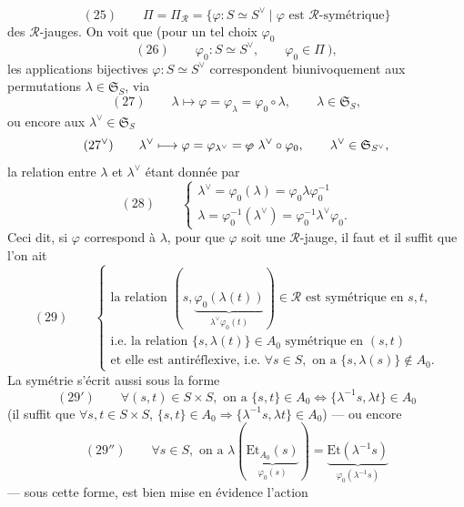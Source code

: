 \documentclass[11pt,a4paper]{article}
\begin{document}
\[
(25)\qquad \Pi = \Pi_{\mathcal{R}} = \{\varphi : S \simeq S^{\vee} \mid \varphi \text{ est } \mathcal{R}\text{-symétrique}\}
\]
des $\mathcal{R}$-jauges.  On voit que (pour un tel
choix $\varphi_0$
\[
(26)\qquad \varphi_0 : S \simeq S^{\vee}, \qquad \varphi_0 \in \Pi\ ),
\]
les applications bijectives $\varphi : S \simeq S^{\vee}$ correspondent
biunivoquement aux permutations $\lambda \in \mathfrak{S}_S$, via
\[
(27)\qquad \lambda \longmapsto \varphi = \varphi_{\lambda} = \varphi_0 \circ \lambda, \qquad \lambda \in \mathfrak{S}_S,
\]
ou encore aux $\lambda^{\vee} \in \mathfrak{S}_{S}$
\[
(27^{\vee})\qquad \lambda^{\vee} \longmapsto \varphi = \varphi_{\lambda^{\vee}} = \text{\struck{$\varphi$}}\ \lambda^{\vee} \circ \varphi_0, \qquad \lambda^{\vee} \in \mathfrak{S}_{S^{\vee}},
\]
la relation entre $\lambda$ et $\lambda^{\vee}$ étant donnée par
\[
(28)\qquad
\begin{cases}
\lambda^{\vee} = \varphi_0(\lambda) = \varphi_0 \lambda \varphi_0^{-1} \\
\lambda = \varphi_0^{-1}(\lambda^{\vee}) = \varphi_0^{-1} \lambda^{\vee} \varphi_0 .
\end{cases}
\]
Ceci dit, si $\varphi$ correspond à $\lambda$, pour que $\varphi$ soit une
$\mathcal{R}$-jauge, il faut et il suffit que l'on ait
\[
(29)\qquad
\begin{cases}
\text{la relation } (s, \underbrace{\varphi_0(\lambda(t))}_{\lambda^{\vee}\varphi_0(t)}) \in \mathcal{R} \text{ est symétrique en } s,t, \\
\text{i.e. la relation } \{s, \lambda(t)\} \in A_0 \text{ symétrique en } (s,t) \\
\text{et elle est antiréflexive, i.e. } \forall s \in S, \text{ on a } \{s, \lambda(s)\} \notin A_0 .
\end{cases}
\]
La symétrie s'écrit aussi sous la forme
\[
(29')\qquad \forall (s,t) \in S \times S, \text{ on a } \{s,t\} \in A_0 \Longleftrightarrow \{\lambda^{-1}s, \lambda t\} \in A_0
\]
(il suffit que $\forall s,t \in S \times S$,
$\{s,t\} \in A_0 \Longrightarrow \{\lambda^{-1}s, \lambda t\} \in A_0$)
— ou encore
\[
(29'')\qquad \forall s \in S, \text{ on a } \lambda(\underbrace{\mathrm{Et}_{A_0}(s)}_{\varphi_0(s)}) = \underbrace{\mathrm{Et}(\lambda^{-1}s)}_{\varphi_0(\lambda^{-1}s)}
\]
— sous cette forme, est bien mise en évidence l'action

\end{document}

